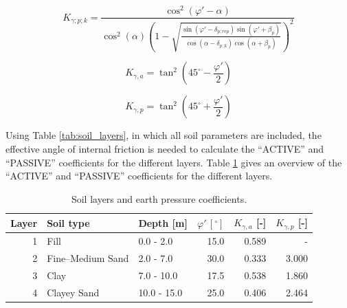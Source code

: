 \begin{equation}
    K_{\gamma;p;k} =
    \frac{
        \cos^{2}\!\left(\varphi' - \alpha\right)
    }{
        \cos^{2}(\alpha)
        \left(
            1 -
            \sqrt{
                \frac{
                    \sin\!\left(\varphi' - \delta_{p;rep}\right)
                    \sin\!\left(\varphi' + \beta_p\right)
                }{
                    \cos\!\left(\alpha - \delta_{p;k}\right)
                    \cos\!\left(\alpha + \beta_p\right)
                }
            }
        \right)^{2}
    }
    \label{eq:K_gamma_p_k}
\end{equation}

\begin{equation}
    K_{\gamma,a} = \tan^{2}\!\left(45^\circ - \frac{\varphi'}{2}\right)
    \label{eq:Ka_tan}
\end{equation}

\begin{equation}
    K_{\gamma,p} = \tan^{2}\!\left(45^\circ + \frac{\varphi'}{2}\right)
    \label{eq:Kp_tan}
\end{equation}

Using Table \ref{tab:soil_layers}, in which all soil parameters are included, the effective angle of internal friction is needed to calculate the “ACTIVE” and “PASSIVE” coefficients for the different layers. Table \ref{tab:layers_ka_kp} gives an overview of the “ACTIVE” and “PASSIVE” coefficients for the different layers. 

\begin{table}[H]
  \centering
  \caption{Soil layers and earth pressure coefficients.}
  \label{tab:layers_ka_kp}
  \small
  \setlength{\tabcolsep}{8pt}
  \renewcommand{\arraystretch}{1.15}
  \begin{tabular}{@{}r l l r r r@{}}
    \toprule
    Layer & Soil type & Depth [m] &
    $\varphi'\,[\boldsymbol{^\circ}]$ &
    $K_{\gamma,a}$ [-] & $K_{\gamma,p}$ [-] \\
    \midrule
    1 & Fill             & 0.0 - 2.0   & 15.0 & 0.589 & - \\
    2 & Fine--Medium Sand& 2.0 - 7.0   & 30.0 & 0.333 & 3.000 \\
    3 & Clay             & 7.0 - 10.0  & 17.5 & 0.538 & 1.860 \\
    4 & Clayey Sand      & 10.0 - 15.0 & 25.0 & 0.406 & 2.464 \\
    \bottomrule 
  \end{tabular}
\end{table}

